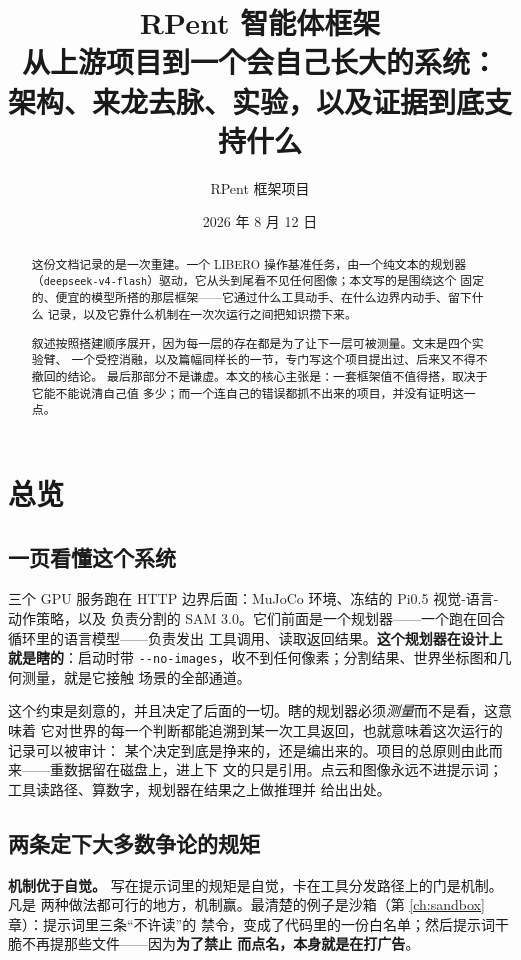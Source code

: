 \documentclass[11pt,a4paper,UTF8,fontset=macnew]{ctexrep}
\title{\vspace{-2em}\textbf{RPent 智能体框架}\\[0.4em]
\large 从上游项目到一个会自己长大的系统：\\
架构、来龙去脉、实验，以及证据到底支持什么}
\author{RPent 框架项目}
\date{2026 年 8 月 12 日}
\newcommand{\keyrule}[1]{\textbf{\textcolor{acc}{#1}}}
\begin{document}
\maketitle

\begin{abstract}
\noindent
这份文档记录的是一次重建。一个 LIBERO 操作基准任务，由一个纯文本的规划器
（\texttt{deepseek-v4-flash}）驱动，它从头到尾看不见任何图像；本文写的是围绕这个
固定的、便宜的模型所搭的那层框架——它通过什么工具动手、在什么边界内动手、留下什么
记录，以及它靠什么机制在一次次运行之间把知识攒下来。

叙述按照搭建顺序展开，因为每一层的存在都是为了让下一层可被测量。文末是四个实验臂、
一个受控消融，以及篇幅同样长的一节，专门写这个项目提出过、后来又不得不撤回的结论。
最后那部分不是谦虚。本文的核心主张是：一套框架值不值得搭，取决于它能不能说清自己值
多少；而一个连自己的错误都抓不出来的项目，并没有证明这一点。
\end{abstract}

\tableofcontents

\chapter{总览}

\section{一页看懂这个系统}

三个 GPU 服务跑在 HTTP 边界后面：MuJoCo 环境、冻结的 Pi0.5 视觉-语言-动作策略，以及
负责分割的 SAM 3.0。它们前面是一个规划器——一个跑在回合循环里的语言模型——负责发出
工具调用、读取返回结果。\textbf{这个规划器在设计上就是瞎的}：启动时带
\texttt{-{}-no-images}，收不到任何像素；分割结果、世界坐标图和几何测量，就是它接触
场景的全部通道。

这个约束是刻意的，并且决定了后面的一切。瞎的规划器必须\emph{测量}而不是看，这意味着
它对世界的每一个判断都能追溯到某一次工具返回，也就意味着这次运行的记录可以被审计：
某个决定到底是挣来的，还是编出来的。项目的总原则由此而来——重数据留在磁盘上，进上下
文的只是引用。点云和图像永远不进提示词；工具读路径、算数字，规划器在结果之上做推理并
给出出处。

\section{两条定下大多数争论的规矩}

\keyrule{机制优于自觉。} 写在提示词里的规矩是自觉，卡在工具分发路径上的门是机制。凡是
两种做法都可行的地方，机制赢。最清楚的例子是沙箱（第 \ref{ch:sandbox} 章）：提示词里三条“不许读”的
禁令，变成了代码里的一份白名单；然后提示词干脆不再提那些文件——因为\textbf{为了禁止
而点名，本身就是在打广告}。
\end{document}
